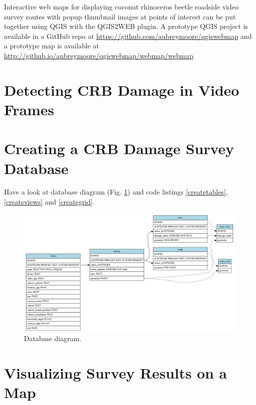 \documentclass[12pt,letterpaper,english,bibliography=totocnumbered, abstract=on]{scrartcl}
\begin{document}
Interactive web maps for displaying coconut rhinoceros beetle roadside video survey routes with popup thumbnail images at points of interest can be put together using QGIS with the QGIS2WEB plugin. A prototype QGIS project is available in a GitHub repo at \url{https://github.com/aubreymoore/qgiswebmap} and a prototype map is available at \url{http://github.io/aubreymoore/qgiswebmap/webmap/webmap}.

\section{Detecting CRB Damage in Video Frames}

\section{Creating a CRB Damage Survey Database}

Have a look at database diagram (Fig. \ref{fig:erd}) and code listings \ref{createtables},  \ref{createviews} and \ref{creategrid}.

\begin{figure}[H]
	\centering
	\includegraphics[width=\linewidth]{images/erd.png}
	\caption{Database diagram.}
	\label{fig:erd}
\end{figure}










\section{Visualizing Survey Results on a Map}
\end{document}
